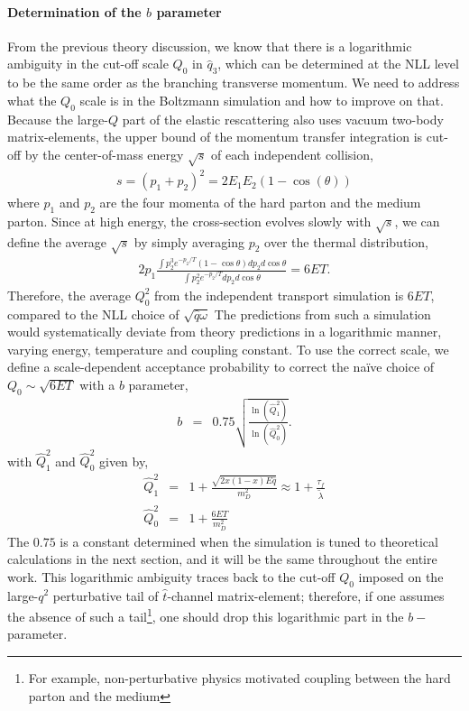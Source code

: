 \paragraph{Determination of the $b$ parameter} From the previous theory discussion, we know that there is a logarithmic ambiguity in the cut-off scale $Q_0$ in $\hat{q}_3$, which can be determined at the NLL level to be the same order as the branching transverse momentum.
We need to address what the $Q_0$ scale is in the Boltzmann simulation and how to improve on that.
Because the large-$Q$ part of the elastic rescattering also uses vacuum two-body matrix-elements, the upper bound of the momentum transfer integration is cut-off by the center-of-mass energy $\sqrt{s}$ of each independent collision,
\begin{eqnarray}
s = (p_1 + p_2)^2 = 2E_1 E_2 (1-\cos(\theta))
\end{eqnarray}
where $p_1$ and $p_2$ are the four momenta of the hard parton and the medium parton.
Since at high energy, the cross-section evolves slowly with $\sqrt{s}$, we can define the average $\sqrt{s}$ by simply averaging $p_2$ over the thermal distribution,
\begin{eqnarray}
2p_1\frac{ \int p_2^3 e^{-p_2/T}(1-\cos\theta) dp_2 d\cos \theta }{\int p_2^2 e^{-p_2/T} dp_2 d\cos \theta} =  6ET.
\end{eqnarray}
Therefore, the average $Q_0^2$ from the independent transport simulation is $6ET$, compared to the NLL choice of $\sqrt{\hat{q} \omega}$
The predictions from such a simulation would systematically deviate from theory predictions in a logarithmic manner, varying energy, temperature and coupling constant.
To use the correct scale, we define a scale-dependent acceptance probability to correct the na\"ive choice of $Q_0 \sim \sqrt{6ET}$ with a $b$ parameter,
\begin{eqnarray}
b &=& 0.75\sqrt{\frac{\ln(\hat{Q}_1^2 )}{\ln(\hat{Q}_0^2 )}}.
\label{eq:NLL-b}
\end{eqnarray}
with $\hat{Q}_1^2$ and $\hat{Q}_0^2$ given by,
\begin{eqnarray}
\hat{Q}_1^2 &=& 1 + \frac{\sqrt{2x(1-x)E\hat{q}}}{m_D^2} \approx 1 + \frac{\tau_f}{\tilde{\lambda}}\\
\hat{Q}_0^2 &=& 1 + \frac{6ET}{m_D^2}
\end{eqnarray}
The $0.75$ is a constant determined when the simulation is tuned to theoretical calculations in the next section, and it will be the same throughout the entire work.
This logarithmic ambiguity traces back to the cut-off $Q_0$ imposed on the large-$q^2$ perturbative tail of $\hat{t}$-channel matrix-element;
therefore, if one assumes the absence of such a tail\footnote{\singlespacing For example, non-perturbative physics motivated coupling between the hard parton and the medium}, one should drop this logarithmic part in the $b-$parameter.


